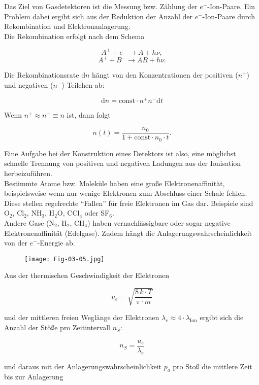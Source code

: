 Das Ziel von Gasdetektoren ist die Messung bzw. Zählung der $e^-$-Ion-Paare. Ein Problem dabei
ergibt sich aus der Reduktion der Anzahl der $e^-$-Ion-Paare durch Rekombination und
Elektronanlagerung.
\\
Die Rekombination erfolgt nach dem Schema

\[A^+ + e^- \longrightarrow A + h\nu, \]
\[A^+ + B^- \longrightarrow AB + h\nu . \]

Die Rekombinationsrate $\mathrm{d}n$ hängt von den Konzentrationen der positiven ($n^+$) und
negativen ($n^-$) Teilchen ab:

\[\mathrm{d}n= \text{const}\cdot n^+ n^- \mathrm{d}t \]

Wenn $n^+\approx n^-\equiv n$ ist, dann folgt

\[n(t) = \frac{n_0}{1+\text{const}\cdot n_0\cdot t}.  \]

\begin{figure}[H]
		\centering
		
\end{figure}


Eine Aufgabe bei der Konstruktion eines Detektors ist also, eine möglichst schnelle Trennung von
positiven und negativen Ladungen aus der Ionisation herbeizuführen.
\\
Bestimmte Atome bzw. Moleküle haben eine große Elektronenaffinität, beispielsweise wenn nur wenige
Elektronen zum Abschluss einer Schale fehlen. Diese stellen regelrechte "`Fallen"' für
freie Elektronen im Gas dar. Beispiele sind O$_2$, Cl$_2$, NH$_3$, H$_2$O, CCl$_4$ oder SF$_6$.
\\
Andere Gase (N$_2$, H$_2$, CH$_4$) haben vernachlässigbare oder sogar negative
Elektronenaffinität (Edelgase). Zudem hängt die Anlagerungswahrscheinlichkeit von der $e^-$-Energie
ab.

\begin{figure}[H]
	\centering
	\texttt{[image: Fig-03-05.jpg]}
\end{figure}

Aus der thermischen Geschwindigkeit der Elektronen 

\[u_e = \sqrt{\frac{8\,k\cdot T}{\pi\cdot m}}  \]

und der mittleren freien Weglänge der Elektronen $\lambda_e \approx 4\cdot \lambda_{\text{Ion}}$
ergibt sich die Anzahl der Stöße pro Zeitintervall $n_S$:

\[ n_S = \frac{u_e}{\lambda_e}  \]

und daraus mit der Anlagerungswahrscheinlichkeit $p_a$ pro Stoß die mittlere Zeit bis zur Anlagerung

